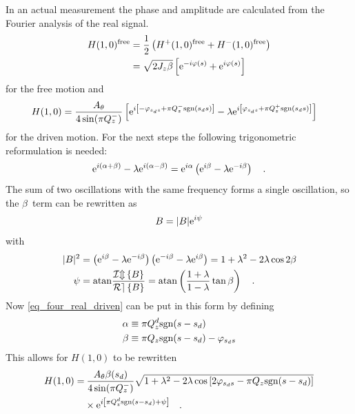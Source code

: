 In an actual measurement the phase and amplitude are calculated from the Fourier analysis of the
real signal.
%
\begin{align}
   H(1,0)^\text{free} &= \frac{1}{2}\left( H^+(1,0)^\text{free} + H^-(1,0)^\text{free} \right)\notag \\
   &= \sqrt{2 J_z\beta} \left[ \text{e}^{-i\varphi(s) } + \text{e}^{i\varphi(s)} \right]
   \label{eq_four_real_free}
\end{align}
%
for the free motion and
%
\begin{align}
   H(1,0)
   &= \frac{A_\theta}{4\sin(\pi Q_z^-)}\left[
        \text{e}^{i\left[-\varphi_{s_ds} + \pi Q_z^-\text{sgn}(s_ds)\right]}
        -\lambda \text{e}^{i\left[\varphi_{s_ds} + \pi Q_z^+\text{sgn}(s_ds)\right]}
       \right]
       \label{eq_four_real_driven}
\end{align}
for the driven motion.
%
For the next steps the following trigonometric reformulation is needed:
%
\begin{equation}
  \text{e}^{i\left( \alpha + \beta \right)} - \lambda \text{e}^{i\left( \alpha - \beta \right)}
  = \text{e}^{i\alpha} \left(\text{e}^{i\beta} - \lambda\text{e}^{-i\beta}\right)
  \quad .
  \label{eq_e_alpha_lambda}
\end{equation}
%
The sum of two oscillations with the same frequency forms a single oscillation, so the $\beta$~term can
be rewritten as
%
\begin{equation}
  B = |B|\text{e}^{i\psi}
\end{equation}
with
%
\begin{align}
  |B|^2 &=  \left( \text{e}^{i\beta}-\lambda\text{e}^{-i\beta} \right)\left( \text{e}^{-i\beta} - \lambda\text{e}^{i\beta} \right)
  = 1+\lambda^2-2\lambda\cos{2\beta} \notag \\
  \psi&= \mathrm{atan} \frac{\mathcal{Im} \left\{ B \right\}}{\mathcal{Re} \left\{ B \right\}} = \mathrm{atan}\left(\frac{1+\lambda}{1-\lambda}\tan \beta\right)
  \quad .
\end{align}
%
Now \eqref{eq_four_real_driven} can be put in this form by defining
%
\begin{align}
  \alpha &\equiv \pi Q^{d}_{z} \text{sgn}(s-s_d) \notag \\
  \beta &\equiv \pi Q_z\text{sgn}(s-s_d) - \varphi_{s_ds}
\end{align}
%
This allows for $H(1,0)$ to be rewritten
%
\begin{align}
  H(1,0) =&\: \frac{A_\theta\beta(s_d)}{4\sin(\pi Q_z^-)}
      \sqrt{1+\lambda^2-2\lambda\cos\left[2\varphi_{s_ds} - \pi Q_z\text{sgn}(s-s_d)\right]} \notag \\
      &\times\text{e}^{i\left[ \pi Q^{d}_{z}\text{sgn}(s-s_d) + \psi \right]}
  \quad .
  \label{eq_H_drv}
\end{align}
